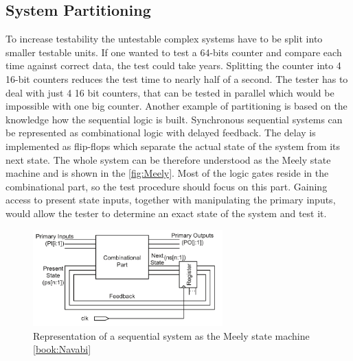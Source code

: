 \subsection{System Partitioning}
To increase testability the untestable complex systems have to be split into smaller testable units. If one wanted to test a 64-bits counter and compare each time against correct data, the test could take years. Splitting the counter into 4 16-bit counters reduces the test time to nearly half of a second. The tester has to deal with just 4 16 bit counters, that can be tested in parallel which would be impossible with one big counter.
Another example of partitioning is based on the knowledge how the sequential logic is built. Synchronous sequential systems can be represented as combinational logic with delayed feedback. The delay is implemented as flip-flops which separate the actual state of the system from its next state. The whole system can be therefore understood as the Meely state machine and is shown in the \autoref{fig:Meely}. Most of the logic gates reside in the combinational part, so the test procedure should focus on this part. Gaining access to present state inputs, together with manipulating the primary inputs, would allow the tester to determine an exact state of the system and test it.

\begin{figure}[H]
\centering
\includegraphics[width=0.65\textwidth]{figures/Meely.PNG}
\caption{Representation of a sequential system as the Meely state machine \ref{book:Navabi}}
\label{fig:Meely}
\end{figure}

